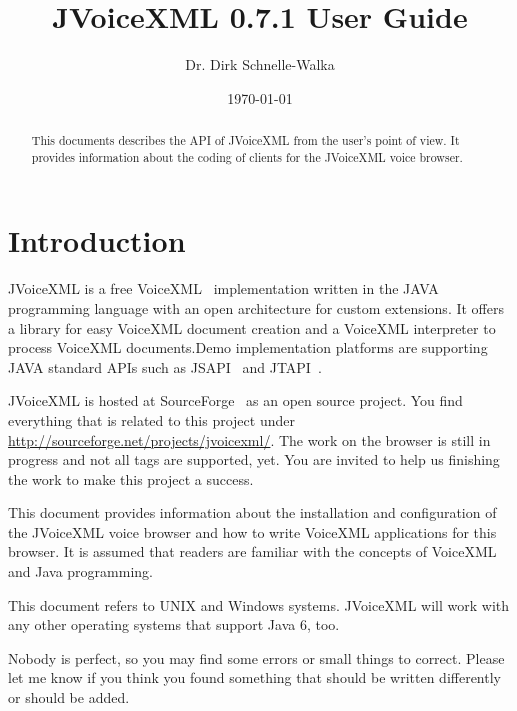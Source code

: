 \documentclass[11pt,a4paper]{article}
\title{JVoiceXML 0.7.1 User Guide}
\author{Dr. Dirk Schnelle-Walka}
\date{\today}
\begin{document}
\pagestyle{empty}

\maketitle

\pagestyle{headings}

\tableofcontents

\newpage

\begin{abstract}
This documents describes the API of JVoiceXML from the user's point of
view. It provides information about the coding of clients for
the JVoiceXML voice browser.
\end{abstract}


\section{Introduction}
\label{sec:introduction}

JVoiceXML is a free VoiceXML~\cite{w3.org:voicexml} implementation written in 
the JAVA programming language with an open architecture for custom
extensions. It offers a library for easy VoiceXML
document creation and a VoiceXML interpreter to process 
VoiceXML documents.Demo implementation platforms are supporting JAVA standard
APIs such as JSAPI~\cite{sun:jsapi} and JTAPI~\cite{sun:jsapi}.

JVoiceXML is hosted at SourceForge~\cite{sourceforge} as an open source project.
You find everything that is related to this project under
\url{http://sourceforge.net/projects/jvoicexml/}.
The work on the browser is still in progress and not all tags are
supported, yet. You are invited to help us finishing the work to make this
project a success.

This document provides information about the installation and
configuration of the JVoiceXML voice browser and how to write
VoiceXML applications for this browser.
It is assumed that readers are familiar with the concepts of
VoiceXML and Java programming.

This document refers to UNIX and Windows systems. JVoiceXML will work with 
any other operating systems that support Java 6, too.

Nobody is perfect, so you may find some errors or small things to correct.
Please let me know if you think you found something that should be written
differently or should be added.
\end{document}
